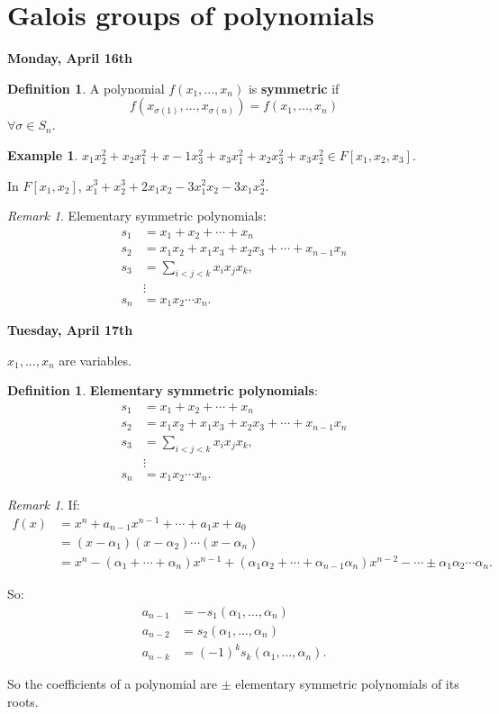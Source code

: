\documentclass[9pt,reqno,twoside]{amsbook}
\theoremstyle{plain}
\numberwithin{section}{chapter}
\numberwithin{equation}{chapter}
\theoremstyle{definition}
\newtheorem{Def}[theorem]{Definition}
\newtheorem{Ex}[theorem]{Example}
\theoremstyle{remark}
\newtheorem{rem}[theorem]{Remark}
\theoremstyle{plain}
\newcommand{\bb}{\vspace{3mm}}
\newcommand{\bee}{\begin{equation}\begin{aligned}}
\newcommand{\eee}{\end{aligned}\end{equation}}
\begin{document}
\section{Galois groups of polynomials}


\textbf{Monday, April 16th}

\begin{Def}
A polynomial $f(x_1,...,x_n)$ is \textbf{symmetric} if $$f(x_{\sigma(1)},...,x_{\sigma(n)}) = f(x_1,...,x_n)$$ 
$\forall \sigma \in S_n$. 
\end{Def}

\begin{Ex}
$x_1x_2^2 + x_2x_1^2 + x-1x_3^2 + x_3x_1^2 + x_2x_3^2 + x_3x_2^2 \in F[x_1,x_2,x_3]$. 

In $F[x_1,x_2]$, $x_1^3 + x_2^3 + 2x_1x_2 - 3x_1^2x_2 - 3x_1x_2^2$. 
\end{Ex}

\begin{rem}
Elementary symmetric polynomials: 
\bee
s_1 &= x_1 + x_2 + \cdots + x_n\\
s_2 &= x_1x_2 + x_1x_3 + x_2x_3 + \cdots + x_{n - 1}x_n\\
s_3 &= \sum_{i < j < k}x_ix_jx_k,\\
& \vdots\\
s_n &= x_1x_2\cdots x_n. 
\eee
\end{rem}


\bb

\textbf{Tuesday, April 17th}

$x_1,...,x_n$ are variables. 

\begin{Def}
\textbf{Elementary symmetric polynomials}: 
\bee
s_1 &= x_1 + x_2 + \cdots + x_n\\
s_2 &= x_1x_2 + x_1x_3 + x_2x_3 + \cdots + x_{n - 1}x_n\\
s_3 &= \sum_{i < j < k}x_ix_jx_k,\\
& \vdots\\
s_n &= x_1x_2\cdots x_n. 
\eee
\end{Def}


\begin{rem}
If:
\bee
f(x) &= x^n + a_{n - 1}x^{n - 1} + \cdots + a_1x + a_0\\
&= (x - \alpha_1)(x - \alpha_2)\cdots(x - \alpha_n)\\
&= x^n - (\alpha_1 + \cdots + \alpha_n)x^{n - 1} + (\alpha_1\alpha_2 + \cdots + \alpha_{n - 1}\alpha_n)x^{n - 2} - \cdots \pm \alpha_1\alpha_2\cdots\alpha_n.
\eee

So:
\bee
a_{n - 1} &= -s_1(\alpha_1,...,\alpha_n)\\
a_{n - 2} &= s_2(\alpha_1,...,\alpha_n)\\
a_{n - k} &= (-1)^ks_k(\alpha_1,...,\alpha_n).
\eee

So the coefficients of a polynomial are $\pm$ elementary symmetric polynomials of its roots. 
\end{rem}
\end{document}
